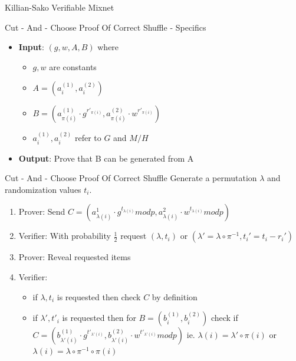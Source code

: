 \documentclass{beamer}
\begin{document}
\begin{frame}[allowframebreaks]{Killian-Sako Verifiable Mixnet \cite{SK95}}
\framebreak

\begin{block}{Cut - And - Choose Proof Of Correct Shuffle  - Specifics}
\begin{itemize}
\item \textbf{Input}: $(g,w,A,B)$ where 
\begin{itemize}
\item $g,w$ are constants
\item $A = (a_i^{(1)},a_i^{(2)})$
\item $B = (a_{\pi(i)}^{(1)} \cdot g^{r'_{\pi(i)}},a_{\pi(i)}^{(2)} \cdot w^{r'_{\pi(i)}})$
\item $a_i^{(1)},a_i^{(2)}$ refer to $G$ and $M/H$
\end{itemize}
\item \textbf{Output}:  Prove that B can be generated from A
\end{itemize}
\end{block}

\framebreak

\begin{block}{Cut - And - Choose Proof Of Correct Shuffle}
Generate a permutation $\lambda$ and randomization values $t_i$.
\begin{enumerate}
\item Prover: Send $C= (a_{\lambda(i)}^{1} \cdot g^{t_{\lambda(i)}} mod p,a_{\lambda(i)}^{2} \cdot w^{t_{\lambda(i)}} mod p)$
\item Verifier: With probability $\frac{1}{2}$ request $(\lambda,t_i)$ or $(\lambda'=\lambda \circ \pi^{-1}, t_i' = t_i - r_i')$ 
\item Prover: Reveal requested items
\item Verifier: 
\begin{itemize}
\small
\item  if $\lambda,t_i$ is requested then check $C$ by definition
\item   if $\lambda',t'_i$ is requested then for
$B = (b_i^{(1)},b_i^{(2)})$ check if  $C = (b_{\lambda'(i)}^{(1)} \cdot g^{t'_{\lambda'(i)}},b_{\lambda'(i)}^{(2)} \cdot w^{t'_{\lambda'(i)}} mod p)$ 
ie. $\lambda(i) = \lambda'  \circ \pi(i)$ or $\lambda(i) = \lambda \circ \pi^{-1} \circ \pi(i)$
\normalsize
\end{itemize} 
\end{enumerate}
\end{block}

\end{frame} 
\end{document}
